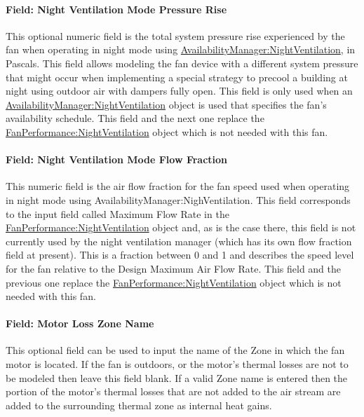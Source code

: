 \paragraph{Field: Night Ventilation Mode Pressure Rise}\label{field-nite-vent-pressure-fansysmodel}

This optional numeric field is the total system pressure rise experienced by the fan when operating in night mode using \hyperref[availabilitymanagernightventilation]{AvailabilityManager:NightVentilation}, in Pascals. This field allows modeling the fan device with a different system pressure that might occur when implementing a special strategy to precool a building at night using outdoor air with dampers fully open. This field is only used when an \hyperref[availabilitymanagernightventilation]{AvailabilityManager:NightVentilation} object is used that specifies the fan's availability schedule. This field and the next one replace the \hyperref[fanperformancenightventilation]{FanPerformance:NightVentilation} object which is not needed with this fan.

\paragraph{Field: Night Ventilation Mode Flow Fraction}\label{field-nite-vent-flow-fraction-fansysmodel}

This numeric field is the air flow fraction for the fan speed used when operating in night mode using AvailabilityManager:NighVentilation. This field corresponds to the input field called Maximum Flow Rate in the \hyperref[fanperformancenightventilation]{FanPerformance:NightVentilation} object and, as is the case there, this field is not currently used by the night ventilation manager (which has its own flow fraction field at present). This is a fraction between 0 and 1 and describes the speed level for the fan relative to the Design Maximum Air Flow Rate. This field and the previous one replace the \hyperref[fanperformancenightventilation]{FanPerformance:NightVentilation} object which is not needed with this fan.

\paragraph{Field: Motor Loss Zone Name}\label{field-loss-zone-name-fansysmodel}

This optional field can be used to input the name of the Zone in which the fan motor is located.  If the fan is outdoors, or the motor's thermal losses are not to be modeled then leave this field blank.  If a valid Zone name is entered then the portion of the motor's thermal losses that are not added to the air stream are added to the surrounding thermal zone as internal heat gains.

